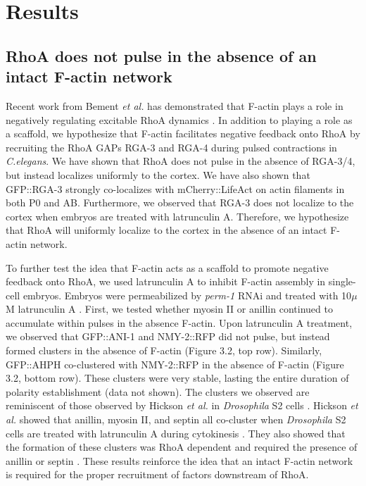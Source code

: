\documentclass{ucetd}
\begin{document}
\section{Results}
\subsection{RhoA does not pulse in the absence of an intact F-actin network}
Recent work from Bement \textit{et al.} has demonstrated that F-actin plays a role in negatively regulating excitable RhoA dynamics \cite{Bement:2015jp}.  In addition to playing a role as a scaffold, we hypothesize that F-actin facilitates negative feedback onto RhoA by recruiting the RhoA GAPs RGA-3 and RGA-4 during pulsed contractions in \textit{C.elegans}.  We have shown that RhoA does not pulse in the absence of RGA-3/4, but instead localizes uniformly to the cortex.  We have also shown that GFP::RGA-3 strongly co-localizes with mCherry::LifeAct on actin filaments in both P0 and AB.  Furthermore, we observed that RGA-3 does not localize to the cortex when embryos are treated with latrunculin A.  Therefore, we hypothesize that RhoA will uniformly localize to the cortex in the absence of an intact F-actin network.



To further test the idea that F-actin acts as a scaffold to promote negative feedback onto RhoA, we used latrunculin A to inhibit F-actin assembly in single-cell embryos.  Embryos were permeabilized by \textit{perm-1} RNAi and treated with 10$\mu$M latrunculin A \cite{Carvalho:2011ce}.  First, we tested whether myosin II or anillin continued to accumulate within pulses in the absence F-actin.  Upon latrunculin A treatment, we observed that GFP::ANI-1 and NMY-2::RFP did not pulse, but instead formed clusters in the absence of F-actin (Figure 3.2, top row).  Similarly, GFP::AHPH co-clustered with NMY-2::RFP in the absence of F-actin (Figure 3.2, bottom row).  These clusters were very stable, lasting the entire duration of polarity establishment (data not shown).  The clusters we observed are reminiscent of those observed by Hickson \textit{et al.} in \textit{Drosophila} S2 cells \cite{Hickson:2008hu}.  Hickson \textit{et al.} showed that anillin, myosin II, and septin all co-cluster when \textit{Drosophila} S2 cells are treated with latrunculin A during cytokinesis \cite{Hickson:2008hu}.  They also showed that the formation of these clusters was RhoA dependent and required the presence of anillin or septin \cite{Hickson:2008hu}.  These results reinforce the idea that an intact F-actin network is required for the proper recruitment of factors downstream of RhoA.
\end{document}
